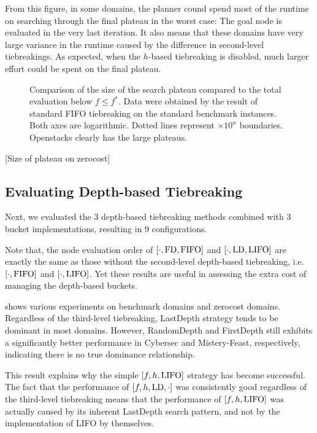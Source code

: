 From this figure, in some domains, the planner cound spend most of the
runtime on searching through the final plateau in the worst case: The
goal node is evaluated in the very last iteration. It also means that
these domains have very large variance in the runtime caused by the
difference in second-level tiebreakings.  As expected, when the
$h$-based tiebreaking is disabled, much larger effort could be spent on
the final plateau.

\begin{figure}[htb]
 \centering {}
 
 \caption{Comparison of the size of the search plateau compared to the
 total evaluation below $f\leq f^*$. Data were obtained by the result of standard FIFO
 tiebreaking on the standard benchmark instances. Both axes are
 logarithmic. Dotted lines represent $\times 10^n$ boundaries.
 Openstacks clearly has the large plateaus.}  \label{plateau}
\end{figure}

[Size of plateau on zerocost]

\subsection{Evaluating Depth-based Tiebreaking}

Next, we evaluated the 3 depth-based tiebreaking methods combined with 3
bucket implementations, resulting in 9 configurations.

Note that, the node evaluation order of $[\cdot,\mbox{FD},\mbox{FIFO}]$ and $[\cdot,\mbox{LD},\mbox{LIFO}]$
are exactly the same as those without the second-level
depth-based tiebreaking, i.e.\ $[\cdot,\mbox{FIFO}]$ and $[\cdot,\mbox{LIFO}]$.
Yet these results are useful in assessing the extra cost of managing the
depth-based buckets.

 shows various experiments on benchmark domains and
zerocost domains. Regardless of the third-level tiebreaking, LastDepth
strategy tends to be dominant in most domains. However, RandomDepth and
FirstDepth still exhibits a significantly better performance in Cybersec
and Mistery-Feast, respectively, indicating there is no true dominance relationship.

This result explains why the simple $[f,h,\mbox{LIFO}]$ strategy has
become successful. The fact that the performance of $[f,h,\mbox{LD},\cdot]$
was consistently good regardless of the third-level tiebreaking means
that the performance of $[f,h,\mbox{LIFO}]$ was actually caused by its
inherent LastDepth search pattern, and not by the implementation of LIFO
by themselves.

